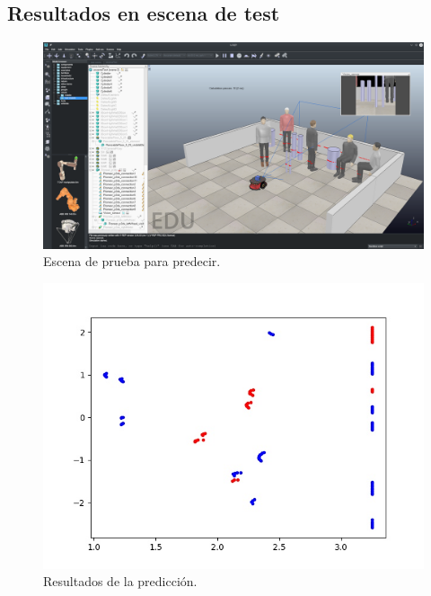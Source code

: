 \documentclass[12pt, spanish]{article}
\begin{document}
\subsection{Resultados en escena de test}

\begin{figure}[H]
    \centering
    \includegraphics[width=\textwidth]{escena_test.png}
    \caption{Escena de prueba para predecir.}
\end{figure}

\begin{figure}[H]
    \centering
    \includegraphics[width=\textwidth]{capturaTest.jpg}
    \caption{Resultados de la predicción.}
\end{figure}


%
%
\end{document}
